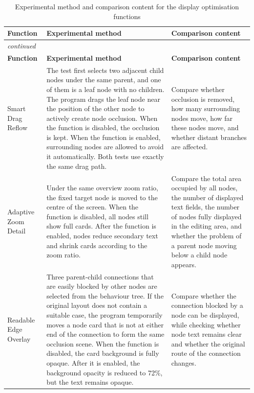 \documentclass[11pt,a4paper,oneside,extrafontsizes]{memoir}
\begin{document}
\begin{center}

\begin{longtable}{@{}p{} p{} p{}@{}}
\caption{Experimental method and comparison content for the display optimisation functions}\label{tab:display-experiment-methods}\\
\toprule
\textbf{Function} & \textbf{Experimental method} & \textbf{Comparison content} \\
\midrule
\endfirsthead
\multicolumn{3}{l}{\itshape continued}\\
\toprule
\textbf{Function} & \textbf{Experimental method} & \textbf{Comparison content} \\
\midrule
\endhead
Smart Drag Reflow & The test first selects two adjacent child nodes under the same parent, and one of them is a leaf node with no children. The program drags the leaf node near the position of the other node to actively create node occlusion. When the function is disabled, the occlusion is kept. When the function is enabled, surrounding nodes are allowed to avoid it automatically. Both tests use exactly the same drag path. & Compare whether occlusion is removed, how many surrounding nodes move, how far these nodes move, and whether distant branches are affected. \\
Adaptive Zoom Detail & Under the same overview zoom ratio, the fixed target node is moved to the centre of the screen. When the function is disabled, all nodes still show full cards. After the function is enabled, nodes reduce secondary text and shrink cards according to the zoom ratio. & Compare the total area occupied by all nodes, the number of displayed text fields, the number of nodes fully displayed in the editing area, and whether the problem of a parent node moving below a child node appears. \\
Readable Edge Overlay & Three parent-child connections that are easily blocked by other nodes are selected from the behaviour tree. If the original layout does not contain a suitable case, the program temporarily moves a node card that is not at either end of the connection to form the same occlusion scene. When the function is disabled, the card background is fully opaque. After it is enabled, the background opacity is reduced to 72\%, but the text remains opaque. & Compare whether the connection blocked by a node can be displayed, while checking whether node text remains clear and whether the original route of the connection changes. \\

\end{longtable}
\end{center}
\end{document}
